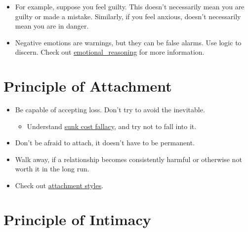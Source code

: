 \documentclass[
]{book}
\providecommand{\tightlist}{%
  \setlength{\itemsep}{0pt}\setlength{\parskip}{0pt}}
\begin{document}
\begin{itemize}
  \begin{itemize}
  \tightlist
  \item
    For example, suppose you feel guilty. This doesn't necessarily mean you are guilty or made a mistake. Similarly, if you feel anxious, doesn't necessarily mean you are in danger.
  \item
    Negative emotions are warnings, but they can be false alarms. Use logic to discern. Check out \href{https://en.wikipedia.org/wiki/Emotional_reasoning}{emotional\_reasoning} for more information.
  \end{itemize}
\end{itemize}

\hypertarget{principle-of-attachment}{%
\section{Principle of Attachment}\label{principle-of-attachment}}

\begin{itemize}
\tightlist
\item
  Be capable of accepting loss. Don't try to avoid the inevitable.

  \begin{itemize}
  \tightlist
  \item
    Understand \href{https://en.wikipedia.org/wiki/Sunk_cost\#Fallacy_effect}{sunk cost fallacy}, and try not to fall into it.
  \end{itemize}
\item
  Don't be afraid to attach, it doesn't have to be permanent.
\item
  Walk away, if a relationship becomes consistently harmful or otherwise not worth it in the long run.
\item
  Check out \href{https://en.m.wikipedia.org/wiki/Attachment_in_adults\#Styles}{attachment styles}.
\end{itemize}

\hypertarget{principle-of-intimacy}{%
\section{Principle of Intimacy}\label{principle-of-intimacy}}
\end{document}
